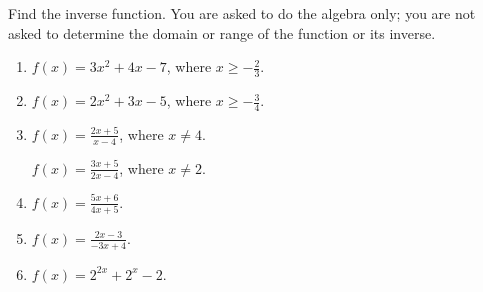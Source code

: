 Find the inverse function. You are asked to do the algebra only; you are not asked to determine the domain or range of the function or its inverse. 
\begin{enumerate} [ref={\fcProblemRef}]
\item $f(x)= 3x^2+4x-7$, where $x\geq -\frac{2}{3}$.

\item $f(x)= 2x^2+3x-5$, where $x\geq -\frac{3}{4}$.

\item $\displaystyle f(x)= \frac{2x+5}{x-4}$, where $x\neq 4$.

 \label{problemFindInversef=(3x+5)/(2x-4)} $\displaystyle f(x)= \frac{3x+5}{2x-4}$, where $x\neq 2$.

\item \label{problemFindIversef=(5x+6)/(4x+5)}  $\displaystyle f(x)= \frac{5x+6}{4x+5}$.

\item  $\displaystyle f(x)= \frac{2x-3}{-3x+4}$.

\item \label{problemFindInversef=2^(2x)+2^x-2} $f(x)=2^{2x}+2^{x}-2$.


\end{enumerate}
